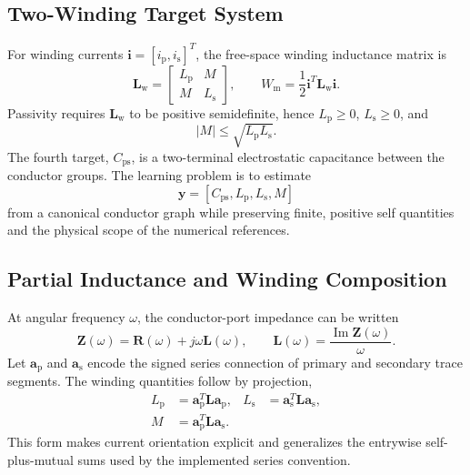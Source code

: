 \documentclass[journal]{IEEEtran}
\newcommand{\Cps}{C_{\mathrm{ps}}}
\newcommand{\Lp}{L_{\mathrm{p}}}
\newcommand{\Ls}{L_{\mathrm{s}}}
\newcommand{\Mut}{M}
\begin{document}
\subsection{Two-Winding Target System}
For winding currents $\mathbf{i}=[i_{\mathrm{p}},i_{\mathrm{s}}]^{T}$, the free-space winding inductance matrix is
\begin{equation}
\mathbf{L}_{\mathrm{w}}=
\begin{bmatrix}
\Lp & \Mut\\
\Mut & \Ls
\end{bmatrix},
\qquad
W_{\mathrm{m}}=\frac{1}{2}\mathbf{i}^{T}\mathbf{L}_{\mathrm{w}}\mathbf{i}.
\label{eq:energy_inductance}
\end{equation}
Passivity requires $\mathbf{L}_{\mathrm{w}}$ to be positive semidefinite, hence $\Lp\geq0$, $\Ls\geq0$, and
\begin{equation}
|\Mut|\leq\sqrt{\Lp\Ls}.
\label{eq:passivity}
\end{equation}
The fourth target, $\Cps$, is a two-terminal electrostatic capacitance between the conductor groups. The learning problem is to estimate
\begin{equation}
\mathbf{y}=[\Cps,\Lp,\Ls,\Mut]
\end{equation}
from a canonical conductor graph while preserving finite, positive self quantities and the physical scope of the numerical references.

\subsection{Partial Inductance and Winding Composition}
At angular frequency $\omega$, the conductor-port impedance can be written
\begin{equation}
\mathbf{Z}(\omega)=\mathbf{R}(\omega)+j\omega\mathbf{L}(\omega),
\qquad
\mathbf{L}(\omega)=\frac{\operatorname{Im}\mathbf{Z}(\omega)}{\omega}.
\label{eq:partial_matrix}
\end{equation}
Let $\mathbf{a}_{\mathrm{p}}$ and $\mathbf{a}_{\mathrm{s}}$ encode the signed series connection of primary and secondary trace segments. The winding quantities follow by projection,
\begin{align}
\Lp&=\mathbf{a}_{\mathrm{p}}^{T}\mathbf{L}\mathbf{a}_{\mathrm{p}}, &
\Ls&=\mathbf{a}_{\mathrm{s}}^{T}\mathbf{L}\mathbf{a}_{\mathrm{s}},\nonumber\\
\Mut&=\mathbf{a}_{\mathrm{p}}^{T}\mathbf{L}\mathbf{a}_{\mathrm{s}}.
\label{eq:winding_projection}
\end{align}
This form makes current orientation explicit and generalizes the entrywise self-plus-mutual sums used by the implemented series convention.
\end{document}
